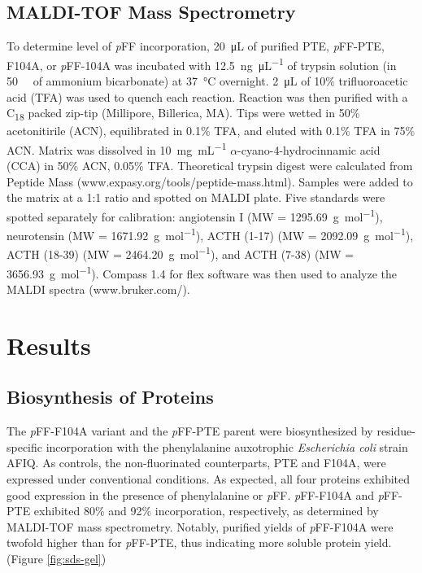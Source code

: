 \begin{refsection}
\subsection{MALDI-TOF Mass Spectrometry}

To determine level of \emph{p}FF incorporation, \SI{20}{\micro\liter} of
purified PTE, \emph{p}FF-PTE, F104A, or \emph{p}FF-104A was incubated with
\SI{12.5}{\ng\per\uL} of trypsin solution (in \SI{50}{\milli\Molar} of ammonium
bicarbonate) at \SI{37}{\celsius} overnight. \SI{2}{\uL} of 10\%
trifluoroacetic acid (TFA) was used to quench each reaction. Reaction was then
purified with a C\textsubscript{18} packed zip-tip (Millipore, Billerica, MA).
Tips were wetted in 50\% acetonitirile (ACN), equilibrated in 0.1\% TFA, and
eluted with 0.1\% TFA in 75\% ACN. Matrix was dissolved in \SI{10}{\mg\per\mL}
$\alpha$-cyano-4-hydrocinnamic acid (CCA) in 50\% ACN, 0.05\% TFA. Theoretical
trypsin digest were calculated from Peptide Mass
(www.expasy.org/tools/peptide-mass.html). Samples were added to the matrix at a
1:1 ratio and spotted on MALDI plate. Five standards were spotted separately
for calibration: angiotensin I (MW = \SI{1295.69}{\g\per\mole}), neurotensin
(MW = \SI{1671.92}{\g\per\mole}), ACTH (1-17) (MW = \SI{2092.09}{\g\per\mole}),
ACTH (18-39) (MW = \SI{2464.20}{\g\per\mole}), and ACTH (7-38) (MW =
\SI{3656.93}{\g\per\mole}).  Compass 1.4 for flex software was then used to
analyze the MALDI spectra (www.bruker.com/).

\section{Results}

\subsection{Biosynthesis of Proteins}

The \emph{p}FF-F104A variant and the \emph{p}FF-PTE parent were biosynthesized
by residue-specific incorporation with the phenylalanine auxotrophic
\emph{Escherichia coli} strain AFIQ\cite{Yang2014a}. As controls, the
non-fluorinated counterparts, PTE and F104A, were expressed under conventional
conditions. As expected, all four proteins exhibited good expression in the
presence of phenylalanine or \emph{p}FF. \emph{p}FF-F104A and \emph{p}FF-PTE
exhibited 80\% and 92\% incorporation, respectively, as determined by MALDI-TOF
mass spectrometry. Notably, purified yields of \emph{p}FF-F104A were twofold
higher than for \emph{p}FF-PTE, thus indicating more soluble protein yield.
(Figure \ref{fig:sds-gel})


\end{refsection}
